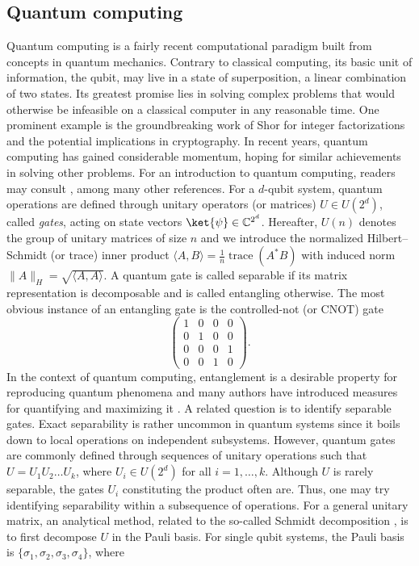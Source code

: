 \documentclass{article}
\numberwithin{equation}{section}
\DeclareMathOperator{\trace}{\operatorname{trace}}
\theoremstyle{definition}
\begin{document}
\subsection{Quantum computing}
\label{se: quantum_computing}
Quantum computing is a fairly recent computational paradigm built from concepts in quantum mechanics. Contrary to classical computing, its basic unit of information, the qubit, may live in a state of superposition, a linear combination of two states. Its greatest promise lies in solving complex problems that would otherwise be infeasible on a classical computer in any reasonable time. One prominent example is the groundbreaking work of Shor \cite{shor1994algorithms,shor1999polynomial} for integer factorizations and the potential implications in cryptography. In recent years, quantum computing has gained considerable momentum, hoping for similar achievements in solving other problems. For an introduction to quantum computing, readers may consult \cite{kaye2006introduction,nielsen2010quantum}, among many other references. For a $d$-qubit system, quantum operations are defined through unitary operators (or matrices) $U \in U(2^d)$, called \emph{gates}, acting on state vectors $\ket{\psi} \in \mathbb{C}^{2^d}$. Hereafter, $U(n)$ denotes the group of unitary matrices of size $n$ and we introduce the normalized Hilbert–Schmidt (or trace) inner product $\langle A,B \rangle = \frac{1}{n}\trace(A^*B)$ with induced norm $\|A\|_H = \sqrt{\langle A, A \rangle}$. A quantum gate is called separable if its matrix representation is decomposable and is called entangling otherwise. The most obvious instance of an entangling gate is the controlled-not (or CNOT) gate
\begin{equation*}
    \begin{pmatrix}
        1 & 0 & 0 & 0 \\
        0 & 1 & 0 & 0 \\
        0 & 0 & 0 & 1 \\
        0 & 0 & 1 & 0
    \end{pmatrix}.
\end{equation*}
In the context of quantum computing, entanglement is a desirable property for reproducing quantum phenomena and many authors have introduced measures for quantifying and maximizing it \cite{kraus2001optimal,balakrishnan2010entangling}. A related question is to identify separable gates. Exact separability is rather uncommon in quantum systems since it boils down to local operations on independent subsystems. However, quantum gates are commonly defined through sequences of unitary operations such that $U=U_1U_2\dots U_k$, where $U_i \in U(2^d)$ for all $i=1,\dots,k$. Although $U$ is rarely separable, the gates $U_i$ constituting the product often are. Thus, one may try identifying separability within a subsequence of operations. For a general unitary matrix, an analytical method, related to the so-called Schmidt decomposition \cite{nielsen2010quantum}, is to first decompose $U$ in the Pauli basis. For single qubit systems, the Pauli basis is $\{\sigma_1,\sigma_2,\sigma_3,\sigma_4\}$, where
\end{document}
